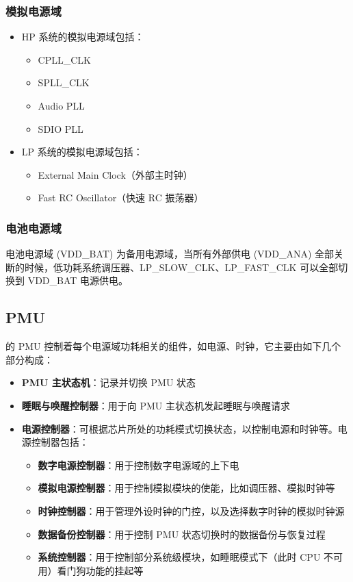 \documentclass[main\_\_CN.tex]{subfiles}
\begin{document}
\subsubsection{模拟电源域}

\begin{itemize}
\item HP 系统的模拟电源域包括：
    \begin{itemize}
    \item CPLL\_CLK
    \item SPLL\_CLK
    \item Audio PLL
    \item SDIO PLL
    \end{itemize}

\item LP 系统的模拟电源域包括：
    \begin{itemize}
    \item External Main Clock（外部主时钟）
    \item Fast RC Oscillator（快速 RC 振荡器）
    \end{itemize}
\end{itemize}

\subsubsection{电池电源域}

电池电源域 (VDD\_BAT) 为备用电源域，当所有外部供电 (VDD\_ANA) 全部关断的时候，低功耗系统调压器、LP\_SLOW\_CLK、LP\_FAST\_CLK 可以全部切换到 VDD\_BAT 电源供电。

\subsection{PMU}

\chipname{} 的 PMU 控制着每个电源域功耗相关的组件，如电源、时钟，它主要由如下几个部分构成：

\begin{itemize}
\item \textbf{PMU 主状态机}：记录并切换 PMU 状态
\item \textbf{睡眠与唤醒控制器}：用于向 PMU 主状态机发起睡眠与唤醒请求
\item \textbf{电源控制器}：可根据芯片所处的功耗模式切换状态，以控制电源和时钟等。电源控制器包括：
    \begin{itemize}
    \item \textbf{数字电源控制器}：用于控制数字电源域的上下电
    \item \textbf{模拟电源控制器}：用于控制模拟模块的使能，比如调压器、模拟时钟等
    \item \textbf{时钟控制器}：用于管理外设时钟的门控，以及选择数字时钟的模拟时钟源
    \item \textbf{数据备份控制器}：用于控制 PMU 状态切换时的数据备份与恢复过程
    \item \textbf{系统控制器}：用于控制部分系统级模块，如睡眠模式下（此时 CPU 不可用）看门狗功能的挂起等
    \end{itemize}
\end{itemize}
\end{document}
